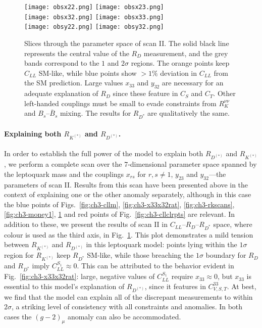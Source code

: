\begin{figure}
    \texttt{[image: obsx22.png]} \hfill
    \texttt{[image: obsx23.png]} \\
    \texttt{[image: obsx32.png]} \hfill
    \texttt{[image: obsx33.png]} \\
    \texttt{[image: obsy22.png]} \hfill
    \texttt{[image: obsy32.png]}
    \caption[Slices through the parameter space of scan II.]{Slices through the
      parameter space of scan II. The solid black line represents the central
      value of the $R_D$ measurement, and the grey bands correspond to the $1$
      and $2\sigma$ regions. The orange points keep $C_{LL}$ SM-like, while blue
      points show $> 1\%$ deviation in $C_{LL}$ from the SM prediction. Large
      values $x_{33}$ and $y_{32}$ are necessary for an adequate explanation of
      $R_D$ since these feature in $C_S$ and $C_T$. Other left-handed couplings
      must be small to evade constraints from $R_K^{\nu\nu}$ and
      $B_s$--$\bar{B}_s$ mixing. The results for $R_{D^*}$ are qualitatively the
      same.}
  \label{fig:ch3-ObsScans}
\end{figure}

\paragraph{Explaining both $R_{K^{(*)}}$ and $R_{D^{(*)}}$.} In order to
establish the full power of the model to explain both $R_{D^{(*)}}$ and
$R_{K^{(*)}}$, we perform a complete scan over the 7-dimensional parameter space
spanned by the leptoquark mass and the couplings $x_{rs}$ for $r,s \neq 1$,
$y_{23}$ and $y_{32}$---the parameters of scan II. Results from this scan have
been presented above in the context of explaining one or the other anomaly
separately, although in this case the blue points of Figs.~\ref{fig:ch3-cllm},
\ref{fig:ch3-x33x32rat}, \ref{fig:ch3-rkscans}, \ref{fig:ch3-money1}, \ref{fig:ch3-ObsScans} and
red points of Fig.~\ref{fig:ch3-cllclrpts} are relevant. In addition to these, we
present the results of scan II in $C_{LL}$--$R_D$--$R_{D^*}$ space, where colour
is used as the third axis, in Fig.~\ref{fig:ch3-ObsScans}. This plot demonstrates a
mild tension between $R_{K^{(*)}}$ and $R_{D^{(*)}}$ in this leptoquark model:
points lying within the $1\sigma$ region for $R_{K^{(*)}}$ keep $R_{ D^* }$
SM-like, while those breaching the $1\sigma$ boundary for $R_D$ and $R_{D^*}$
imply $C^{S_{1}}_{LL} \approx 0$. This can be attributed to the behavior evident in
Fig.~\ref{fig:ch3-x33x32rat}: large, negative values of $C_{LL}^{S_{1}}$ require
$x_{33} \approx 0$, but $x_{33}$ is essential to this model's explanation of
$R_{D^{(*)}}$, since it features in $C^{33}_{V,S,T}$. At best, we find that the
model can explain all of the discrepant measurements to within $2\sigma$, a
striking level of consistency with all constraints and anomalies. In both cases
the $(g-2)_\mu$ anomaly can also be accommodated.

